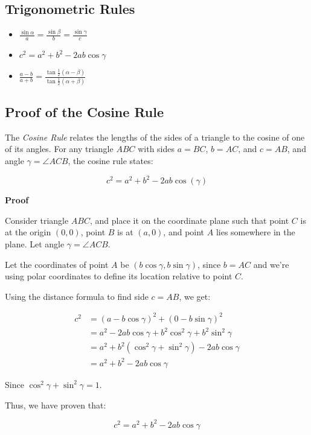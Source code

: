 \subsection{Trigonometric Rules}

\begin{itemize}[label =\(-\)]
	\item \(\frac{\sin \alpha}{a} = \frac{\sin \beta}{b} = \frac{\sin \gamma}{c}\)
	\item \(c^2 = a^2 + b^2 - 2ab \cos \gamma\)
	\item \(\frac{a - b}{a + b} = \frac{\tan \frac{1}{2}(\alpha - \beta)}{\tan \frac{1}{2} (\alpha + \beta)}\)
\end{itemize}

\subsection{Proof of the Cosine Rule}

The \emph{Cosine Rule} relates the lengths of the sides of a triangle to the cosine of one of its angles. For any triangle \( ABC \) with sides \( a = BC \), \( b = AC \), and \( c = AB \), and angle \( \gamma = \angle ACB \), the cosine rule states:

\[
c^2 = a^2 + b^2 - 2ab\cos(\gamma)
\]

\textbf{Proof}

Consider triangle \( ABC \), and place it on the coordinate plane such that point \( C \) is at the origin \( (0,0) \), point \( B \) is at \( (a,0) \), and point \( A \) 
lies somewhere in the plane. Let angle \( \gamma = \angle ACB \).
\vspace{\baselineskip}

Let the coordinates of point \( A \) be \( (b\cos\gamma, b\sin\gamma) \), since \( b = AC \) and we’re using polar coordinates to define its location relative to point \( C \).
\vspace{\baselineskip}

Using the distance formula to find side \( c = AB \), we get:

\begin{align*}
c^2 &= {(a - b\cos\gamma)}^2 + {(0 - b\sin\gamma)}^2 \\
&= a^2 - 2ab\cos\gamma + b^2\cos^2\gamma + b^2\sin^2\gamma \\
&= a^2 + b^2(\cos^2\gamma + \sin^2\gamma) - 2ab\cos\gamma \\
&= a^2 + b^2 - 2ab\cos\gamma
\end{align*}

Since \( \cos^2\gamma + \sin^2\gamma = 1 \).
\vspace{\baselineskip}

Thus, we have proven that:

\[
c^2 = a^2 + b^2 - 2ab\cos\gamma
\]

\QED